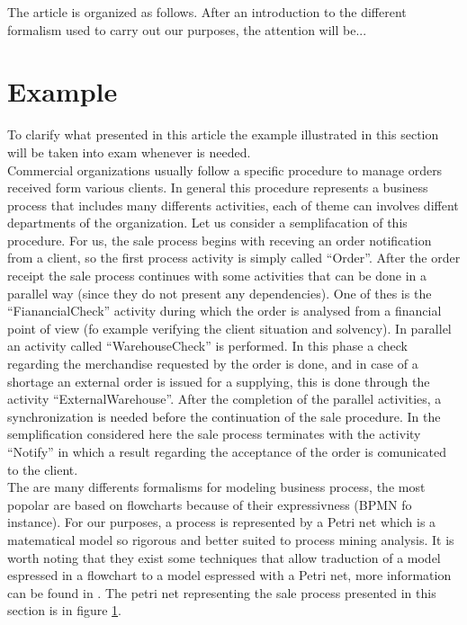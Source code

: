 \documentclass[11pt]{article}
\begin{document}
The article is organized as follows. After an introduction to the different formalism used to carry out our purposes, the attention will be...


\section{Example}\label{example}
To clarify what presented in this article the example illustrated in this section will be taken into exam whenever is needed.\\

Commercial organizations usually follow a specific procedure to manage orders received form various clients. In general this procedure represents a business process that includes many differents activities, each of theme can involves diffent departments of the organization. Let us consider a semplifacation of this procedure. For us, the sale process begins with receving an order notification from a client, so the first process activity is simply called ``Order''. After the order receipt the sale process continues with some activities that can be done in a parallel way (since they do not present any dependencies). One of thes is the ``FianancialCheck'' activity during which the order is analysed from a financial point of view (fo example verifying the client situation and solvency). In parallel an activity called ``WarehouseCheck'' is performed. In this phase a check regarding the merchandise requested by the order is done, and in case of a shortage an external order is issued for a supplying, this is done through the activity ``ExternalWarehouse''. After the completion of the  parallel activities, a synchronization is needed before the continuation of the sale procedure. In the semplification considered here the sale process terminates with the activity ``Notify'' in which a result regarding the acceptance of the order is comunicated to the client.\\

The are many differents formalisms for modeling business process, the most popolar are based on flowcharts because of their expressivness (BPMN fo instance). For our purposes, a process is represented by a Petri net which is a matematical model so rigorous and better suited to process mining analysis. It is worth noting that they exist some techniques that allow traduction of a model espressed in a flowchart to a model espressed with a Petri net, more information can be found in \cite{}. The petri net representing the sale process presented in this section is in figure \ref{example}.\\
\end{document}
